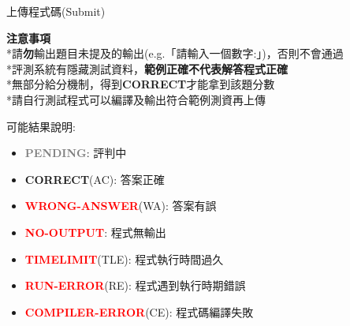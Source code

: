 \documentclass[aspectratio=169,xcolor=dvipsnames]{beamer}
\begin{document}
    \begin{frame}{上傳程式碼(Submit)}
    
        \textbf{注意事項} \\
        *請\textbf{勿}輸出題目未提及的輸出(e.g.「請輸入一個數字:」)，否則不會通過 \\
        *評測系統有隱藏測試資料，\textbf{範例正確不代表解答程式正確} \\
        *無部分給分機制，得到\textbf{\textcolor{OliveGreen}{CORRECT}}才能拿到該題分數 \\
        *請自行測試程式可以編譯及輸出符合範例測資再上傳
        
        \vspace{1em}
        可能結果說明:
        \begin{itemize}
                \item \textbf{\textcolor{gray}{PENDING}}: 評判中
                \item \textbf{\textcolor{OliveGreen}{CORRECT}}(AC): 答案正確
                \item \textbf{\textcolor{red}{WRONG-ANSWER}}(WA): 答案有誤
                \item \textbf{\textcolor{red}{NO-OUTPUT}}: 程式無輸出
                \item \textbf{\textcolor{red}{TIMELIMIT}}(TLE): 程式執行時間過久
                \item \textbf{\textcolor{red}{RUN-ERROR}}(RE): 程式遇到執行時期錯誤
                \item \textbf{\textcolor{red}{COMPILER-ERROR}}(CE): 程式碼編譯失敗
        \end{itemize}
        
    \end{frame}
\end{document}
